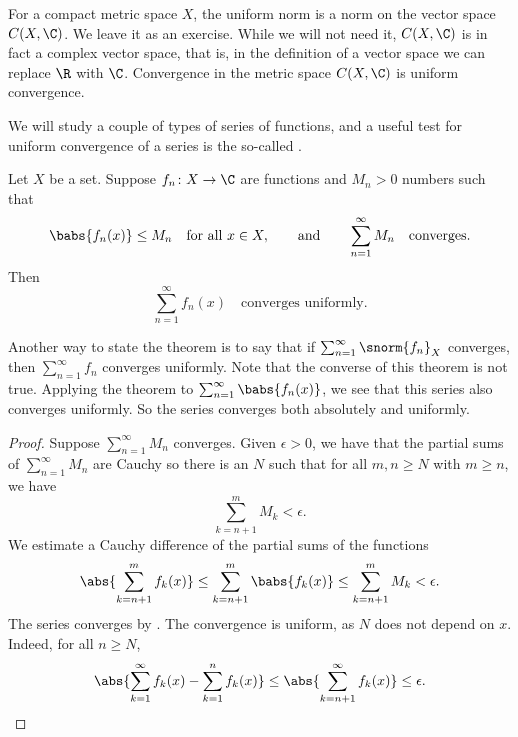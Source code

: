 For a compact metric space $X$,
the uniform norm is a norm on the vector space $C(X,\C)$.
We leave it as an exercise.
While we will not need it, $C(X,\C)$ is in fact a complex
vector space, that is, in the definition of a vector space we can replace
$\R$ with $\C$.
Convergence in the metric space $C(X,\C)$ is
uniform convergence.

We will study a couple of types of series of functions, and
a useful test for uniform convergence of a series is the 
so-called \emph{}.

\begin{thm} \label{thm:weiermtest}
Let $X$ be a set.
Suppose $f_n \colon X \to \C$ are functions and $M_n > 0$ numbers such
that
\begin{equation*}
\babs{f_n(x)}\leq M_n \quad \text{for all } x \in X,
\qquad \text{and} \qquad
\sum_{n=1}^\infty M_n
\quad \text{converges}.
\end{equation*}
Then
\begin{equation*}
\sum_{n=1}^\infty f_n(x)
\quad \text{converges uniformly}.
\end{equation*}
\end{thm}

Another way to state the theorem is to say that if
$\sum_{n=1}^\infty \snorm{f_n}_X$ converges, then $\sum_{n=1}^\infty f_n$ converges uniformly.
Note that the converse of this theorem is not true.
Applying the theorem to $\sum_{n=1}^\infty \babs{f_n(x)}$, we
see that this series also converges uniformly.  So the series converges both absolutely
and uniformly.

\begin{proof}
Suppose $\sum_{n=1}^\infty M_n$ converges.  Given $\epsilon > 0$,
we have that the partial sums of $\sum_{n=1}^\infty M_n$ are Cauchy so
there is an $N$ such that for all $m, n \geq N$ with $m \geq n$, we have
\begin{equation*}
\sum_{k=n+1}^m M_k < \epsilon .
\end{equation*}
We estimate a Cauchy difference of the partial
sums of the functions
\begin{equation*}
\abs{\sum_{k=n+1}^m f_k(x)} \leq
\sum_{k=n+1}^m \babs{f_k(x)} \leq
\sum_{k=n+1}^m M_k < \epsilon .
\end{equation*}
The series converges by .
The convergence is uniform, as $N$ does not depend on $x$.
Indeed, for all $n \geq N$,
\begin{equation*}
\abs{\sum_{k=1}^\infty f_k(x) - \sum_{k=1}^n f_k(x)} \leq
\abs{\sum_{k=n+1}^\infty f_k(x)} \leq \epsilon .
\qedhere
\end{equation*}
\end{proof}

